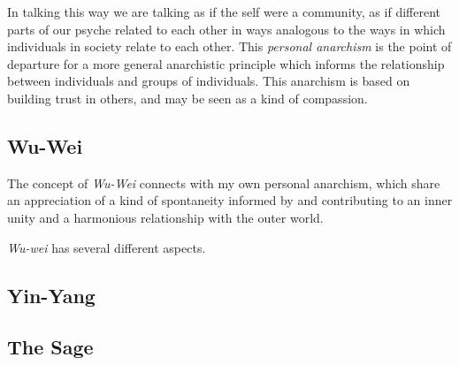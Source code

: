 \documentclass[numreferences]{rbjk}
\begin{document}
\begin{article}
In talking this way we are talking as if the self were a community, as if different parts of our psyche related to each other in ways analogous to the ways in which individuals in society relate to each other.
This {\it personal anarchism} is the point of departure for a more general anarchistic principle which informs the relationship between individuals and groups of individuals.
This anarchism is based on building trust in others, and may be seen as a kind of compassion.

\subsection{Wu-Wei}

The concept of {\it Wu-Wei} connects with my own personal anarchism, which share an appreciation of a kind of spontaneity informed by and contributing to an inner unity and a harmonious relationship with the outer world.

{\it Wu-wei} has several different aspects.

\subsection{Yin-Yang}


\subsection{The Sage}



%
%


\end{article}
\end{document}
